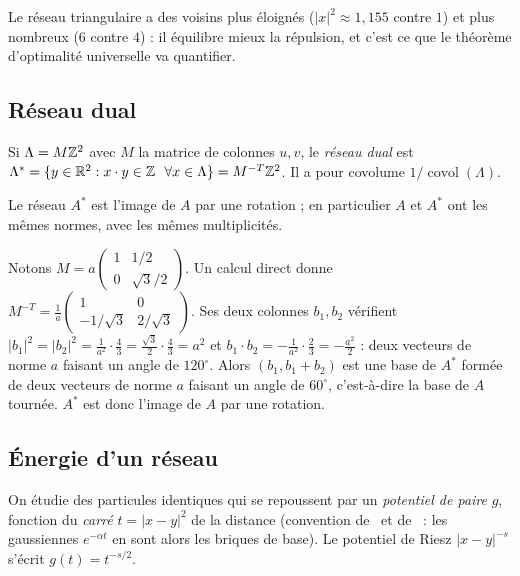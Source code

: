 Le réseau triangulaire a des voisins plus éloignés ($|x|^2\approx1{,}155$ contre $1$) et plus nombreux ($6$ contre $4$) :
il \og équilibre \fg{} mieux la répulsion, et c'est ce que le théorème d'optimalité universelle va quantifier.

\subsection{Réseau dual}

\begin{definition}\label{ch1:def:dual}
Si $\Lambda=M\mathbb{Z}^2$ avec $M$ la matrice de colonnes $u,v$, le \emph{réseau dual} est
$\Lambda^*=\{y\in\mathbb{R}^2 : x\cdot y\in\mathbb{Z}\ \ \forall x\in\Lambda\}=M^{-T}\mathbb{Z}^2$. Il a pour covolume $1/\operatorname{covol}(\Lambda)$.
\end{definition}

\begin{lemma}\label{ch1:lem:autodual}
Le réseau $A^*$ est l'image de $A$ par une rotation ; en particulier $A$ et $A^*$ ont les mêmes normes, avec les mêmes multiplicités. \tierC{}
\end{lemma}

\begin{humanproof}
Notons $M=a\begin{pmatrix}1&1/2\\0&\sqrt3/2\end{pmatrix}$. Un calcul direct donne
$M^{-T}=\frac1a\begin{pmatrix}1&0\\-1/\sqrt3&2/\sqrt3\end{pmatrix}$. Ses deux colonnes $b_1,b_2$ vérifient
$|b_1|^2=|b_2|^2=\frac{1}{a^2}\cdot\frac43=\frac{\sqrt3}{2}\cdot\frac43=a^2$ et $b_1\cdot b_2=-\frac{1}{a^2}\cdot\frac23=-\frac{a^2}{2}$ :
deux vecteurs de norme $a$ faisant un angle de $120^\circ$. Alors $(b_1,b_1+b_2)$ est une base de $A^*$ formée de deux vecteurs
de norme $a$ faisant un angle de $60^\circ$, c'est-à-dire la base de $A$ tournée. $A^*$ est donc l'image de $A$ par une rotation.
\end{humanproof}

\subsection{Énergie d'un réseau}

On étudie des particules identiques qui se repoussent par un \emph{potentiel de paire} $g$, fonction du \emph{carré} $t=|x-y|^2$ de
la distance (convention de~\cite{ckmrv} et de~\cite{oai} : les gaussiennes $e^{-\alpha t}$ en sont alors les briques de base).
Le potentiel de Riesz $|x-y|^{-s}$ s'écrit $g(t)=t^{-s/2}$.

